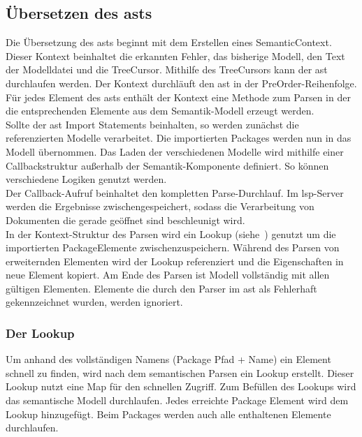 \documentclass[./einleitung.tex]{subfiles}
\begin{document}
    \subsection{Übersetzen des \acrshort{ast}s}\label{subsec:ubersetzen-des-asts}
    Die Übersetzung des \acrshort{ast}s beginnt mit dem Erstellen eines SemanticContext.
    Dieser Kontext beinhaltet die erkannten Fehler, das bisherige Modell, den Text der Modelldatei und die TreeCursor.
    Mithilfe des TreeCursors kann der \acrshort{ast} durchlaufen werden.
    Der Kontext durchläuft den \acrshort{ast} in der PreOrder-Reihenfolge.
    Für jedes Element des \acrshort{ast}s enthält der Kontext eine Methode zum Parsen in der die entsprechenden Elemente aus dem Semantik-Modell erzeugt werden.\\
    Sollte der \acrshort{ast} Import Statements beinhalten, so werden zunächst die referenzierten Modelle verarbeitet.
    Die importierten Packages werden nun in das Modell übernommen.
    Das Laden der verschiedenen Modelle wird mithilfe einer Callbackstruktur außerhalb der Semantik-Komponente definiert.
    So können verschiedene Logiken genutzt werden. \\
    Der Callback-Aufruf beinhaltet den kompletten Parse-Durchlauf.
    Im \acrshort{lsp}-Server werden die Ergebnisse zwischengespeichert, sodass die Verarbeitung von Dokumenten die gerade geöffnet sind beschleunigt wird.\\
    In der Kontext-Struktur des Parsen wird ein Lookup (siehe~) genutzt um die importierten PackageElemente zwischenzuspeichern.
    Während des Parsen von erweiternden Elementen wird der Lookup referenziert und die Eigenschaften in neue Element kopiert.
    Am Ende des Parsen ist Modell vollständig mit allen gültigen Elementen.
    Elemente die durch den Parser im \acrshort{ast} als Fehlerhaft gekennzeichnet wurden, werden ignoriert.

    \subsubsection{Der Lookup}\label{subsubsec:lookup}
    Um anhand des vollständigen Namens (Package Pfad + Name) ein Element schnell zu finden, wird nach dem semantischen Parsen ein Lookup erstellt.
    Dieser Lookup nutzt eine Map für den schnellen Zugriff.
    Zum Befüllen des Lookups wird das semantische Modell durchlaufen.
    Jedes erreichte Package Element wird dem Lookup hinzugefügt.
    Beim Packages werden auch alle enthaltenen Elemente durchlaufen.
\end{document}
